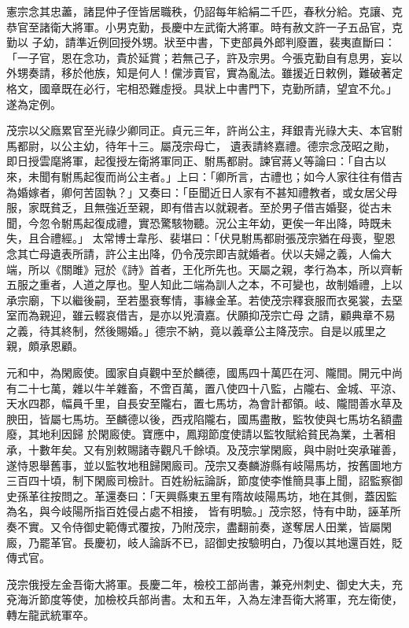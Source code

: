 \begin{pinyinscope}
 憲宗念其忠藎，諸昆仲子侄皆居職秩，仍詔每年給絹二千匹，春秋分給。克讓、克恭官至諸衛大將軍。小男克勤，長慶中左武衛大將軍。時有赦文許一子五品官，克勤以
 子幼，請準近例回授外甥。狀至中書，下吏部員外郎判廢置，裴夷直斷曰：「一子官，恩在念功，貴於延賞；若無己子，許及宗男。今張克勤自有息男，妄以外甥奏請，移於他族，知是何人！儻涉賣官，實為亂法。雖援近日敕例，難破著定格文，國章既在必行，宅相恐難虛授。具狀上中書門下，克勤所請，望宜不允。」遂為定例。



 茂宗以父廕累官至光祿少卿同正。貞元三年，許尚公主，拜銀青光祿大夫、本官駙馬都尉，以公主幼，待年十三。屬茂宗母亡，
 遺表請終嘉禮。德宗念茂昭之勛，即日授雲麾將軍，起復授左衛將軍同正、駙馬都尉。諫官蔣乂等論曰：「自古以來，未聞有駙馬起復而尚公主者。」上曰：「卿所言，古禮也；如今人家往往有借吉為婚嫁者，卿何苦固執？」又奏曰：「臣聞近日人家有不甚知禮教者，或女居父母服，家既貧乏，且無強近至親，即有借吉以就親者。至於男子借吉婚娶，從古未聞，今忽令駙馬起復成禮，實恐驚駭物聽。況公主年幼，更俟一年出降，時既未失，且合禮經。」
 太常博士韋彤、裴堪曰：「伏見駙馬都尉張茂宗猶在母喪，聖恩念其亡母遺表所請，許公主出降，仍令茂宗即吉就婚者。伏以夫婦之義，人倫大端，所以《關雎》冠於《詩》首者，王化所先也。天屬之親，孝行為本，所以齊斬五服之重者，人道之厚也。聖人知此二端為訓人之本，不可變也，故制婚禮，上以承宗廟，下以繼後嗣，至若墨衰奪情，事緣金革。若使茂宗釋衰服而衣冕裳，去堊室而為親迎，雖云輟哀借吉，是亦以兇瀆嘉。伏願抑茂宗亡母
 之請，顧典章不易之義，待其終制，然後賜婚。」德宗不納，竟以義章公主降茂宗。自是以戚里之親，頗承恩顧。



 元和中，為閑廄使。國家自貞觀中至於麟德，國馬四十萬匹在河、隴間。開元中尚有二十七萬，雜以牛羊雜畜，不啻百萬，置八使四十八監，占隴右、金城、平涼、天水四郡，幅員千里，自長安至隴右，置七馬坊，為會計都領。岐、隴間善水草及腴田，皆屬七馬坊。至麟德以後，西戎陷隴右，國馬盡散，監牧使與七馬坊名額盡廢，其地利因歸
 於閑廄使。寶應中，鳳翔節度使請以監牧賦給貧民為業，土著相承，十數年矣。又有別敕賜諸寺觀凡千餘頃。及茂宗掌閑廄，與中尉吐突承璀善，遂恃恩舉舊事，並以監牧地租歸閑廄司。茂宗又奏麟游縣有岐陽馬坊，按舊圖地方三百四十頃，制下閑廄司檢計。百姓紛紜論訴，節度使李惟簡具事上聞，詔監察御史孫革往按問之。革還奏曰：「天興縣東五里有隋故岐陽馬坊，地在其側，蓋因監為名，與今岐陽所指百姓侵占處不相接，
 皆有明驗。」茂宗怒，恃有中助，誣革所奏不實。又令侍御史範傳式覆按，乃附茂宗，盡翻前奏，遂奪居人田業，皆屬閑廄，乃罷革官。長慶初，岐人論訴不已，詔御史按驗明白，乃復以其地還百姓，貶傳式官。



 茂宗俄授左金吾衛大將軍。長慶二年，檢校工部尚書，兼兗州刺史、御史大夫，充兗海沂節度等使，加檢校兵部尚書。太和五年，入為左津吾衛大將軍，充左衛使，轉左龍武統軍卒。




\end{pinyinscope}
